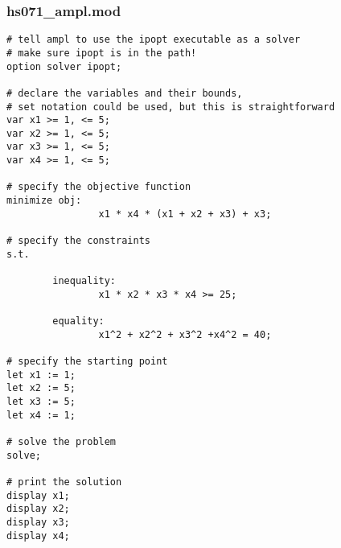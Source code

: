 \documentclass[letter,10pt]{article}
\begin{document}
\subsubsection{hs071\_ampl.mod}
\begin{verbatim}
# tell ampl to use the ipopt executable as a solver
# make sure ipopt is in the path!
option solver ipopt;

# declare the variables and their bounds, 
# set notation could be used, but this is straightforward
var x1 >= 1, <= 5; 
var x2 >= 1, <= 5; 
var x3 >= 1, <= 5; 
var x4 >= 1, <= 5;

# specify the objective function
minimize obj:
                x1 * x4 * (x1 + x2 + x3) + x3;
        
# specify the constraints
s.t.
        
        inequality:
                x1 * x2 * x3 * x4 >= 25;
                
        equality:
                x1^2 + x2^2 + x3^2 +x4^2 = 40;

# specify the starting point            
let x1 := 1;
let x2 := 5;
let x3 := 5;
let x4 := 1;

# solve the problem
solve;

# print the solution
display x1;
display x2;
display x3;
display x4;
\end{verbatim}
\end{document}
